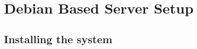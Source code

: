 \begin{enumerate}
\begin{comment}
	1..2
	# Tapper-Suite-Name: Tapper-Deployment
	# Tapper-Suite-Version: 1.001
	# Tapper-Machine-Name: cernvm-server
	ok - Hello test world
	ok - Just another description

# Send the report to the tapper server using netcat
$ cat demo_report.tap | netcat -q7 -w1 cernvm-server 7357
\end{lstlisting}

\item 	Finally, ssh login to one of the test machine that was set up earlier, \emph{in our examples, cernvm-host} and send another 
		sample test report to the tapper server, to ensure that the web interface, MCP, database, and reports framework are all working 
		by viewing the tapper reports in your browser at the following url: \url{http://localhost/tapper/reports} You should now see a
		report from whatever the ``Tapper-Machine-Name'' in demo\_report.tap was set as. \emph{For the example demo\_report.tap provided 
		below it would be cernvm-testclient}.

\lstset{language=bash,caption= Send a Report to the \tapper~Server from a Test Client}
\begin{lstlisting}
# Save the following in a file named demo_report.tap
$ vi demo_report.tap

	1..2
	# Tapper-Suite-Name: Tapper-Deployment
	# Tapper-Suite-Version: 1.001
	# Tapper-Machine-Name: cernvm-testclient
	ok - Hello test world
	ok - Just another description

# Send the report to the tapper server using netcat
$ cat demo_report.tap | netcat -q7 -w1 cernvm-server 7357
\end{lstlisting}

\item	Now that it has been verified that the tapper server, including the web interface, MCP, database, and reports framework 
		are all working; return to the sections titled ``Setting up the Tapper Test Suite''	for each of the test client, as 
		there are unique instructions for each operating system.
\end{comment}
\end{enumerate}




\newpage
\section{Debian Based Server Setup}
\subsection{Installing the system}
